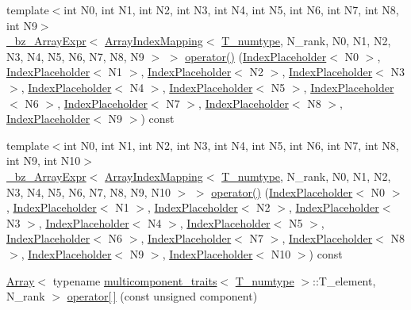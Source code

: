 \begin{DoxyCompactItemize}
\item 
{\footnotesize template$<$int N0, int N1, int N2, int N3, int N4, int N5, int N6, int N7, int N8, int N9$>$ }\\\hyperlink{class__bz__ArrayExpr}{\+\_\+bz\+\_\+\+Array\+Expr}$<$ \hyperlink{classArrayIndexMapping}{Array\+Index\+Mapping}$<$ \hyperlink{classArray_ae72770f4a1d2f8b7193badafc320f008}{T\+\_\+numtype}, N\+\_\+rank, N0, N1, N2, N3, N4, N5, N6, N7, N8, N9 $>$ $>$ \hyperlink{classArray_a884132ef6673ebde9e3ad7da53972713}{operator()} (\hyperlink{classIndexPlaceholder}{Index\+Placeholder}$<$ N0 $>$, \hyperlink{classIndexPlaceholder}{Index\+Placeholder}$<$ N1 $>$, \hyperlink{classIndexPlaceholder}{Index\+Placeholder}$<$ N2 $>$, \hyperlink{classIndexPlaceholder}{Index\+Placeholder}$<$ N3 $>$, \hyperlink{classIndexPlaceholder}{Index\+Placeholder}$<$ N4 $>$, \hyperlink{classIndexPlaceholder}{Index\+Placeholder}$<$ N5 $>$, \hyperlink{classIndexPlaceholder}{Index\+Placeholder}$<$ N6 $>$, \hyperlink{classIndexPlaceholder}{Index\+Placeholder}$<$ N7 $>$, \hyperlink{classIndexPlaceholder}{Index\+Placeholder}$<$ N8 $>$, \hyperlink{classIndexPlaceholder}{Index\+Placeholder}$<$ N9 $>$) const 
\item 
{\footnotesize template$<$int N0, int N1, int N2, int N3, int N4, int N5, int N6, int N7, int N8, int N9, int N10$>$ }\\\hyperlink{class__bz__ArrayExpr}{\+\_\+bz\+\_\+\+Array\+Expr}$<$ \hyperlink{classArrayIndexMapping}{Array\+Index\+Mapping}$<$ \hyperlink{classArray_ae72770f4a1d2f8b7193badafc320f008}{T\+\_\+numtype}, N\+\_\+rank, N0, N1, N2, N3, N4, N5, N6, N7, N8, N9, N10 $>$ $>$ \hyperlink{classArray_a943c2ce225d117fe68c3441ea3d07fa7}{operator()} (\hyperlink{classIndexPlaceholder}{Index\+Placeholder}$<$ N0 $>$, \hyperlink{classIndexPlaceholder}{Index\+Placeholder}$<$ N1 $>$, \hyperlink{classIndexPlaceholder}{Index\+Placeholder}$<$ N2 $>$, \hyperlink{classIndexPlaceholder}{Index\+Placeholder}$<$ N3 $>$, \hyperlink{classIndexPlaceholder}{Index\+Placeholder}$<$ N4 $>$, \hyperlink{classIndexPlaceholder}{Index\+Placeholder}$<$ N5 $>$, \hyperlink{classIndexPlaceholder}{Index\+Placeholder}$<$ N6 $>$, \hyperlink{classIndexPlaceholder}{Index\+Placeholder}$<$ N7 $>$, \hyperlink{classIndexPlaceholder}{Index\+Placeholder}$<$ N8 $>$, \hyperlink{classIndexPlaceholder}{Index\+Placeholder}$<$ N9 $>$, \hyperlink{classIndexPlaceholder}{Index\+Placeholder}$<$ N10 $>$) const 
\item 
\hyperlink{classArray}{Array}$<$ typename \hyperlink{structmulticomponent__traits}{multicomponent\+\_\+traits}$<$ \hyperlink{classArray_ae72770f4a1d2f8b7193badafc320f008}{T\+\_\+numtype} $>$\+::T\+\_\+element, N\+\_\+rank $>$ \hyperlink{classArray_a2037930103cd6058ad58126616ea90b2}{operator\mbox{[}$\,$\mbox{]}} (const unsigned component)

\end{DoxyCompactItemize}
